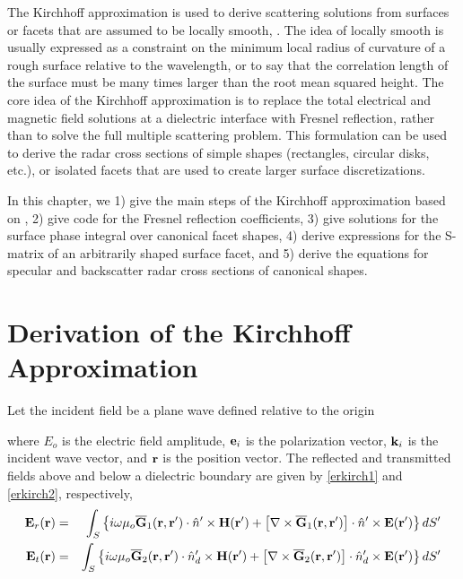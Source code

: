

The Kirchhoff approximation is used to derive scattering solutions from surfaces or facets that are assumed to be locally smooth, \cite{kong1986electromagnetic}. The idea of locally smooth is usually expressed as a constraint on the minimum local radius of curvature of a rough surface relative to the wavelength, or to say that the correlation length of the surface must be many times larger than the root mean squared height. The core idea of the Kirchhoff approximation is to replace the total electrical and magnetic field solutions at a dielectric interface with Fresnel reflection, rather than to solve the full multiple scattering problem. This formulation can be used to derive the radar cross sections of simple shapes (rectangles, circular disks, etc.), or isolated facets that are used to create larger surface discretizations.

In this chapter, we 1) give the main steps of the Kirchhoff approximation based on \cite{kong1986electromagnetic}, 2) give code for the Fresnel reflection coefficients, 3) give solutions for the surface phase integral over canonical facet shapes, 4) derive expressions for the S-matrix of an arbitrarily shaped surface facet, and 5) derive the equations for specular and backscatter radar cross sections of canonical shapes.


\section{Derivation of the Kirchhoff Approximation}

Let the incident field be a plane wave defined relative to the origin

\noindent where $E_o$ is the electric field amplitude, $\mathbf{e}_i$ is the polarization vector, $\mathbf{k}_i$ is the incident wave vector, and $ \mathbf{r}$ is the position vector. The reflected and transmitted fields above and below a dielectric boundary are given by \eqref{erkirch1} and \eqref{erkirch2}, respectively, 
\begin{eqnarray}
\mathbf{E}_r(\mathbf{r}) & = & \int_S \left\{ i\omega \mu_o \overline{\mathbf{G}}_{1}(\mathbf{r},\mathbf{r}') \cdot \hat{n}' \times \mathbf{H}(\mathbf{r}') + \left[\nabla \times \overline{\mathbf{G}}_{1}(\mathbf{r},\mathbf{r}') \right] \cdot \hat{n}' \times \mathbf{E}(\mathbf{r}')\right\} dS' \label{erkirch1} \\
\mathbf{E}_t(\mathbf{r}) & = & \int_S \left\{ i\omega \mu_o \overline{\mathbf{G}}_{2}(\mathbf{r},\mathbf{r}') \cdot \hat{n}_d' \times \mathbf{H}(\mathbf{r}') + \left[\nabla \times \overline{\mathbf{G}}_{2}(\mathbf{r},\mathbf{r}') \right] \cdot \hat{n}_d' \times \mathbf{E}(\mathbf{r}')\right\} dS' \label{erkirch2} 
\end{eqnarray}

